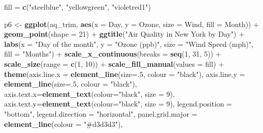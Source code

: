 \documentclass[]{article}
\newenvironment{Shaded}{\begin{snugshade}}{\end{snugshade}}
\newcommand{\KeywordTok}[1]{\textcolor[rgb]{0.13,0.29,0.53}{\textbf{{#1}}}}
\newcommand{\DataTypeTok}[1]{\textcolor[rgb]{0.13,0.29,0.53}{{#1}}}
\newcommand{\DecValTok}[1]{\textcolor[rgb]{0.00,0.00,0.81}{{#1}}}
\newcommand{\StringTok}[1]{\textcolor[rgb]{0.31,0.60,0.02}{{#1}}}
\newcommand{\NormalTok}[1]{{#1}}
\begin{document}
\begin{Shaded}
\begin{Highlighting}[]
\NormalTok{fill =}\StringTok{ }\KeywordTok{c}\NormalTok{(}\StringTok{"steelblue"}\NormalTok{, }\StringTok{"yellowgreen"}\NormalTok{, }\StringTok{"violetred1"}\NormalTok{)}

\NormalTok{p6 <-}\StringTok{ }\KeywordTok{ggplot}\NormalTok{(aq_trim, }\KeywordTok{aes}\NormalTok{(}\DataTypeTok{x =} \NormalTok{Day, }\DataTypeTok{y =} \NormalTok{Ozone, }\DataTypeTok{size =} \NormalTok{Wind, }\DataTypeTok{fill =} \NormalTok{Month)) +}
\StringTok{      }\KeywordTok{geom_point}\NormalTok{(}\DataTypeTok{shape =} \DecValTok{21}\NormalTok{) +}
\StringTok{      }\KeywordTok{ggtitle}\NormalTok{(}\StringTok{"Air Quality in New York by Day"}\NormalTok{) +}\StringTok{ }
\StringTok{      }\KeywordTok{labs}\NormalTok{(}\DataTypeTok{x =} \StringTok{"Day of the month"}\NormalTok{, }\DataTypeTok{y =} \StringTok{"Ozone (ppb)"}\NormalTok{, }\DataTypeTok{size =} \StringTok{"Wind Speed (mph)"}\NormalTok{, }\DataTypeTok{fill =} \StringTok{"Months"}\NormalTok{) +}
\StringTok{      }\KeywordTok{scale_x_continuous}\NormalTok{(}\DataTypeTok{breaks =} \KeywordTok{seq}\NormalTok{(}\DecValTok{1}\NormalTok{, }\DecValTok{31}\NormalTok{, }\DecValTok{5}\NormalTok{)) +}
\StringTok{      }\KeywordTok{scale_size}\NormalTok{(}\DataTypeTok{range =} \KeywordTok{c}\NormalTok{(}\DecValTok{1}\NormalTok{, }\DecValTok{10}\NormalTok{)) +}
\StringTok{      }\KeywordTok{scale_fill_manual}\NormalTok{(}\DataTypeTok{values =} \NormalTok{fill) +}
\StringTok{      }\KeywordTok{theme}\NormalTok{(}\DataTypeTok{axis.line.x =} \KeywordTok{element_line}\NormalTok{(}\DataTypeTok{size=}\NormalTok{.}\DecValTok{5}\NormalTok{, }\DataTypeTok{colour =} \StringTok{"black"}\NormalTok{), }
            \DataTypeTok{axis.line.y =} \KeywordTok{element_line}\NormalTok{(}\DataTypeTok{size=}\NormalTok{.}\DecValTok{5}\NormalTok{, }\DataTypeTok{colour =} \StringTok{"black"}\NormalTok{), }
            \DataTypeTok{axis.text.x=}\KeywordTok{element_text}\NormalTok{(}\DataTypeTok{colour=}\StringTok{"black"}\NormalTok{, }\DataTypeTok{size =} \DecValTok{9}\NormalTok{), }
            \DataTypeTok{axis.text.y=}\KeywordTok{element_text}\NormalTok{(}\DataTypeTok{colour=}\StringTok{"black"}\NormalTok{, }\DataTypeTok{size =} \DecValTok{9}\NormalTok{),}
            \DataTypeTok{legend.position =} \StringTok{"bottom"}\NormalTok{, }\DataTypeTok{legend.direction =} \StringTok{"horizontal"}\NormalTok{,}
            \DataTypeTok{panel.grid.major =} \KeywordTok{element_line}\NormalTok{(}\DataTypeTok{colour =} \StringTok{"#d3d3d3"}\NormalTok{), }

\end{Highlighting}
\end{Shaded}
\end{document}
